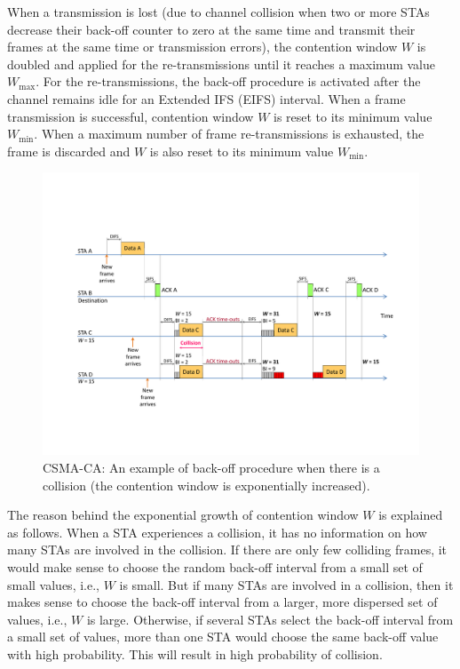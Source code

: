 When a transmission is lost (due to channel collision when two or more STAs decrease their back-off counter to zero at the same time and transmit their frames at the same time or transmission errors), the contention window $W$ is doubled and applied for the re-transmissions until it reaches a maximum value $W_{\max}$. For the re-transmissions, the back-off procedure is activated after the channel remains idle for an Extended IFS (EIFS) interval. When a frame transmission is successful, contention window $W$ is reset to its minimum value $W_{\min}$. When a maximum number of frame re-transmissions is exhausted, the frame is discarded and $W$ is also reset to its minimum value $W_{\min}$.

\begin{figure}[!t]
	\centering
	\includegraphics[width=1.0\columnwidth]{figures2/CSMA-CA-back-off-with-collision}
	\caption{CSMA-CA: An example of back-off procedure when there is a collision (the contention window is exponentially increased).}
	\label{figs:CSMA-CA-back-off-with-collision}
\end{figure}

The reason behind the exponential growth of contention window $W$ is explained as follows. When a STA experiences a collision, it has no information on how many STAs are involved in the collision. If there are only few colliding frames, it would make sense to choose the random back-off interval from a small set of small values, i.e., $W$ is small. But if many STAs are involved in a collision, then it makes sense to choose the back-off interval from a larger, more dispersed set of values, i.e., $W$ is large. Otherwise, if several STAs select the back-off interval from a small set of values, more than one STA would choose the same back-off value with high probability. This will result in high probability of collision.

